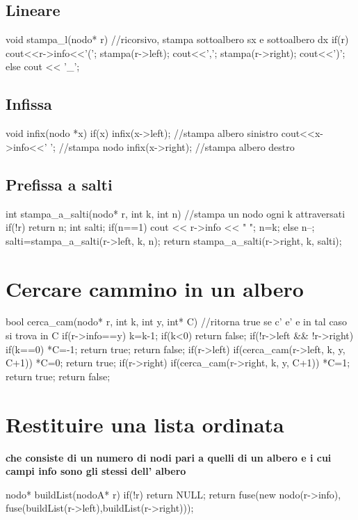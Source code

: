 \subsection{Lineare}
\begin{codice}

void stampa_l(nodo* r) {    
//ricorsivo, stampa sottoalbero sx e sottoalbero dx
if(r){
    cout<<r->info<<'(';
    stampa(r->left);
    cout<<',';
    stampa(r->right);
    cout<<')';
}
else cout << '_';
}
\end{codice}

\subsection{Infissa}
\begin{codice}

void infix(nodo *x) {
if(x) {
infix(x->left);  //stampa albero sinistro
cout<<x->info<<' '; //stampa nodo
infix(x->right);  //stampa albero destro
}
}
\end{codice}

\subsection{Prefissa a salti}
\begin{codice}

int stampa_a_salti(nodo* r, int k, int n) {  //stampa un nodo ogni k attraversati
if(!r) return n;
int salti;
if(n==1) {
    cout << r->info << " ";
    n=k;	
}
else n--;
salti=stampa_a_salti(r->left, k, n);
return stampa_a_salti(r->right, k, salti);
}
\end{codice}

\section{Cercare cammino in un albero}
\begin{codice}

bool cerca_cam(nodo* r, int k, int y, int* C) { 
//ritorna true se c' e' e in tal caso si trova in C
if(r->info==y) k=k-1;
if(k<0) return false;
if(!r->left && !r->right) {
    if(k==0) {
        *C=-1;
        return true;
    }
    return false;
}
if(r->left) {
    if(cerca_cam(r->left, k, y, C+1)) {
        *C=0;
        return true;
    }
}
if(r->right) {
    if(cerca_cam(r->right, k, y, C+1)) {
        *C=1;
        return true;
    }
}
return false;
}
\end{codice}


\section{Restituire una lista ordinata} 
\textbf{che consiste di un numero di nodi pari a quelli di un albero e i cui campi info sono gli stessi dell' albero}
\begin{codice}

nodo* buildList(nodoA* r) {
if(!r) return NULL;
return fuse(new nodo(r->info), fuse(buildList(r->left),buildList(r->right)));
}
\end{codice}

